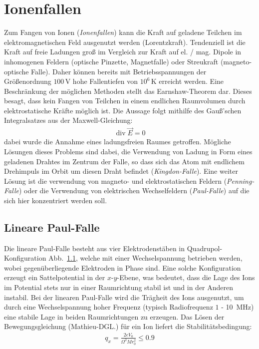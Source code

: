\documentclass[twocolumn]{revtex4}
\DeclareMathOperator{\divergence}{div}
\begin{document}
\section{Ionenfallen}
Zum Fangen von Ionen (\emph{Ionenfallen}) kann die Kraft auf geladene Teilchen im elektromagnetischen Feld ausgenutzt werden (Lorentzkraft).
Tendenziell ist die Kraft auf freie Ladungen groß im Vergleich zur Kraft auf el. / mag. Dipole in inhomogenen Feldern (optische Pinzette, Magnetfalle) oder Streukraft (magneto-optische Falle).
Daher können bereits mit Betriebsspannungen der Größenordnung $100\,\mathrm{V}$ hohe Fallentiefen von $10^6\,\mathrm{K}$ erreicht werden.
Eine Beschränkung der möglichen Methoden stellt das Earnshaw-Theorem dar.
Dieses besagt, dass kein Fangen von Teilchen in einem endlichen Raumvolumen durch elektrostatische Kräfte möglich ist.
Die Aussage folgt mithilfe des Gauß'schen Integralsatzes aus der Maxwell-Gleichung:
\begin{align}
	\divergence \vec{E} = 0
\end{align}
dabei wurde die Annahme eines ladungsfreien Raumes getroffen.
Mögliche Lösungen dieses Problems sind dabei, die Verwendung von Ladung in Form eines geladenen Drahtes im Zentrum der Falle, so dass sich das Atom mit endlichem Drehimpuls im Orbit um diesen Draht befindet (\emph{Kingdon-Falle}).
Eine weiter Lösung ist die verwendung von magneto- und elektrostatischen Feldern (\emph{Penning-Falle}) oder die Verwendung von elektrischen Wechselfeldern (\emph{Paul-Falle}) auf die sich hier konzentriert werden soll.

\subsection{Lineare Paul-Falle}
Die lineare Paul-Falle besteht aus vier Elektrodenstäben in Quadrupol-Konfiguration Abb.~\ref{}, welche mit einer Wechselspannung betrieben werden, wobei gegenüberliegende Elektroden in Phase sind.
Eine solche Konfiguration erzeugt ein Sattelpotential in der $x$-$y$-Ebene, was bedeutet, dass die Lage des Ions im Potential stets nur in einer Raumrichtung stabil ist und in der Anderen instabil.
Bei der linearen Paul-Falle wird die Trägheit des Ions ausgenutzt, um durch eine Wechselspannung hoher Frequenz (typisch Radiofrequenz $1$ - \SI{10}{MHz}) eine stabile Lage in beiden Raumrichtungen zu erzeugen.
Das Lösen der Bewegungsgleichung (Mathieu-DGL.) für ein Ion liefert die Stabilitätsbedingung:
\begin{align}
	q_x = \frac{2 e V_0}{\Omega^2 M r_0^2} \leq \num{0.9}
\end{align}
\end{document}
